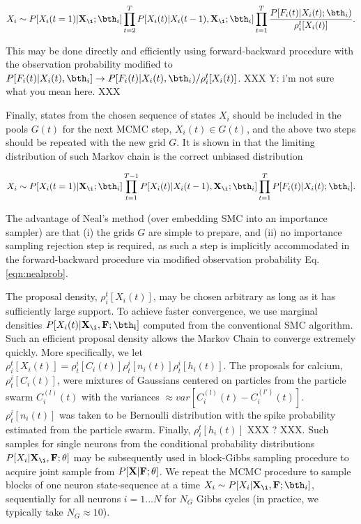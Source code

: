 \begin{equation}\label{eqn:nealprob}
X_i\sim P[X_i(t=1)|{\bf X}_{\i}; \bth_i]\prod\limits_{t=2}^{T}P[X_i(t)|X_i(t-1), {\bf X}_{\i}; \bth_i] \prod\limits_{t=1}^{T} \frac{P[F_i(t)|X_i(t); \bth_i)}{\rho_i^t[X_i(t)]}.
\end{equation}

This may be done directly and efficiently using forward-backward procedure with the observation probability modified to $P[F_i(t)|X_i(t), \bth_i]\rightarrow P[F_i(t)|X_i(t), \bth_i)/{\rho_i^t[X_i(t)]}$.  XXX Y: i'm not sure what you mean here.  XXX

Finally, states from the chosen sequence of states $X_i$ should be included in the pools $G(t)$ for the next MCMC step, $X_i(t)\in G(t)$, and the above two steps should be repeated with the new grid $G$. It is shown in \cite{NBR03} that the limiting distribution of such Markov chain is the correct unbiased distribution

\begin{equation}
X_i \sim P[X_i(t=1)|{\bf X}_{\i}; \bth_i]\prod\limits_{t=1}^{T-1}P[X_i(t)|X_i(t-1), {\bf X}_{\i}; \bth_i]\prod\limits_{t=1}^{T}P[F_i(t)|X_i(t); \bth_i].
\end{equation}

The advantage of Neal's method (over embedding SMC into an importance sampler) are that (i) the grids $G$ are simple to prepare, and (ii) no importance sampling rejection step is required, as such a  step is implicitly accommodated in the forward-backward procedure via modified observation probability Eq. \eqref{eqn:nealprob}.

The proposal density, $\rho_i^t[X_i(t)]$, may be chosen arbitrary as long as it has sufficiently large support.  To achieve faster convergence, we use marginal densities $P[X_i(t)|{\bf X}_{\i}, \bf F; \bth_i]$ computed from the conventional SMC algorithm. Such an efficient proposal density allows the Markov Chain to converge extremely quickly.  More specifically, we let $\rho_i^t[X_i(t)] = \rho^i_t[C_i(t)] \rho^i_t[n_i(t)] \rho^i_t[h_i(t)].$  The proposals for calcium, $\rho^i_t[C_i(t)]$, were mixtures of Gaussians centered on particles from the particle swarm $C_i^{(l)}(t)$ with the variances $\approx var\left[C_i^{(l)}(t)-C_i^{(l')}(t) \right]$. $\rho^i_t[n_i(t)]$ was taken to be Bernoulli distribution with the spike probability estimated from the particle swarm. Finally, $\rho_i^t[h_i(t)]$ XXX ? XXX.  Such samples for single neurons from the conditional probability distributions $P[X_i|{\bf X}_{\i}, \bf F; \theta]$ may be subsequently used in block-Gibbs sampling procedure to acquire joint sample from $P[{\bf X}| {\bf F}; \theta]$.  We repeat the MCMC procedure to sample blocks of one neuron state-sequence at a time $X_i\sim P[X_{i}|{\bf X}_{\i},{\bf F}; \bth_i]$, sequentially for all neurons $i=1\ldots N$ for $N_G$ Gibbs cycles (in practice, we typically take $N_G \approx 10$).  

